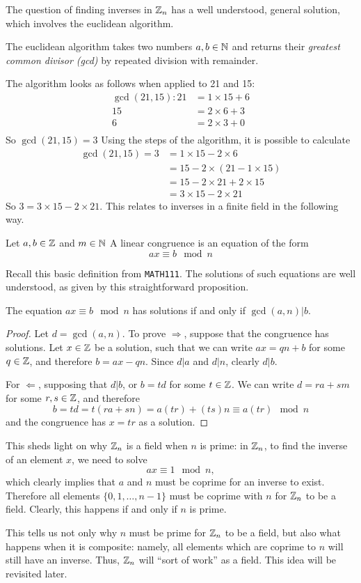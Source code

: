 The question of finding inverses in $\mathbb{Z}_{n}$ has a well understood, general solution, which involves the euclidean algorithm.
\begin{definition}
	The euclidean algorithm takes two numbers $a,b \in \mathbb{N}$ and returns their \emph{greatest common divisor (gcd)} by repeated division with remainder.
\end{definition}
The algorithm looks as follows when applied to 21 and 15:
\begin{align*}
	\gcd(21,15):21 &= 1\times15 + 6\\
	15 &= 2\times6 + 3\\
	6 &= 2\times3 + 0\\
\end{align*}
So $\gcd(21,15)=3$
Using the steps of the algorithm, it is possible to calculate
\begin{align*}
	\gcd(21,15) = 3 &= 1\times15 - 2\times6\\
	&= 15 - 2\times(21 - 1\times15)\\
	&= 15 - 2\times21 + 2\times15\\
	&=3\times15 - 2\times21
\end{align*}
So $3 = 3\times15 - 2\times21$. This relates to inverses in a finite field in the following way.
\begin{definition}
	Let $a,b \in \mathbb{Z}$ and $m \in \mathbb{N}$ A linear congruence is an equation of the form
	$$ax \equiv b \mod n$$
\end{definition}
Recall this basic definition from \texttt{MATH111}. The solutions of such equations are well understood, as given by this straightforward proposition.
\begin{proposition}
	The equation $ax \equiv b \mod n$ has solutions if and only if $\gcd(a,n)|b$.
\end{proposition}
\begin{proof}
	Let $d = \gcd(a,n)$. To prove $\Rightarrow$, suppose that the congruence has solutions. Let $x \in \mathbb{Z}$ be a solution, such that we can write $ax = qn + b$ for some $q \in \mathbb{Z}$, and therefore $b = ax - qn$. Since $d|a$ and $d|n$, clearly $d|b$.

	For  $\Leftarrow$, supposing that $d|b$, or $b=td$ for some $t \in \mathbb{Z}$. We can write $d = ra + sm$ for some $r,s \in \mathbb{Z}$, and therefore
	$$b = td = t(ra + sn) = a(tr) + (ts)n \equiv a(tr) \mod n$$
	and the congruence has $x = tr$ as a solution.
\end{proof}
This sheds light on why $\mathbb{Z}_{n}$ is a field when $n$ is prime: in $\mathbb{Z}_{n}$, to find the inverse of an element $x$, we need to solve
$$ax \equiv 1 \mod n,$$
which clearly implies that $a$ and $n$ must be coprime for an inverse to exist. Therefore all elements $\{0,1,\ldots,n-1\}$ must be coprime with $n$ for $\mathbb{Z}_{n}$ to be a field. Clearly, this happens if and only if $n$ is prime.

This tells us not only why $n$ must be prime for $\mathbb{Z}_{n}$ to be a field, but also what happens when it is composite: namely, all elements which are coprime to $n$ will still have an inverse. Thus, $\mathbb{Z}_{n}$ will ``sort of work'' as a field. This idea will be revisited later.
